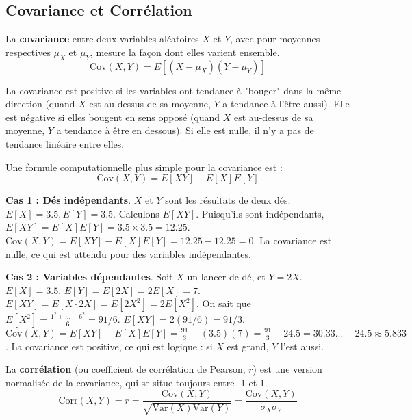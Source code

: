 \subsection{Covariance et Corrélation}

\begin{definitionbox}[Covariance]
La \textbf{covariance} entre deux variables aléatoires $X$ et $Y$, avec pour moyennes respectives $\mu_X$ et $\mu_Y$, mesure la façon dont elles varient ensemble.
$$\text{Cov}(X,Y) = E[(X - \mu_X)(Y - \mu_Y)]$$
\end{definitionbox}

\begin{intuitionbox}
La covariance est positive si les variables ont tendance à "bouger" dans la même direction (quand $X$ est au-dessus de sa moyenne, $Y$ a tendance à l'être aussi). Elle est négative si elles bougent en sens opposé (quand $X$ est au-dessus de sa moyenne, $Y$ a tendance à être en dessous). Si elle est nulle, il n'y a pas de tendance linéaire entre elles.
\end{intuitionbox}

\begin{theorembox}
Une formule computationnelle plus simple pour la covariance est :
$$\text{Cov}(X,Y) = E[XY] - E[X]E[Y]$$
\end{theorembox}

\begin{examplebox}
\textbf{Cas 1 : Dés indépendants}. $X$ et $Y$ sont les résultats de deux dés. $E[X]=3.5, E[Y]=3.5$.
Calculons $E[XY]$. Puisqu'ils sont indépendants, $E[XY] = E[X]E[Y] = 3.5 \times 3.5 = 12.25$.
$\text{Cov}(X,Y) = E[XY] - E[X]E[Y] = 12.25 - 12.25 = 0$.
La covariance est nulle, ce qui est attendu pour des variables indépendantes.

\textbf{Cas 2 : Variables dépendantes}. Soit $X$ un lancer de dé, et $Y = 2X$.
$E[X] = 3.5$. $E[Y] = E[2X] = 2E[X] = 7$.
$E[XY] = E[X \cdot 2X] = E[2X^2] = 2 E[X^2]$.
On sait que $E[X^2] = \frac{1^2+...+6^2}{6} = 91/6$.
$E[XY] = 2(91/6) = 91/3$.
$\text{Cov}(X,Y) = E[XY] - E[X]E[Y] = \frac{91}{3} - (3.5)(7) = \frac{91}{3} - 24.5 = 30.33... - 24.5 \approx 5.833$.
La covariance est positive, ce qui est logique : si $X$ est grand, $Y$ l'est aussi.
\end{examplebox}

\begin{definitionbox}[Corrélation]
La \textbf{corrélation} (ou coefficient de corrélation de Pearson, $r$) est une version normalisée de la covariance, qui se situe toujours entre -1 et 1.
$$\text{Corr}(X,Y) = r = \frac{\text{Cov}(X,Y)}{\sqrt{\text{Var}(X)\text{Var}(Y)}} = \frac{\text{Cov}(X,Y)}{\sigma_X \sigma_Y}$$
\end{definitionbox}

